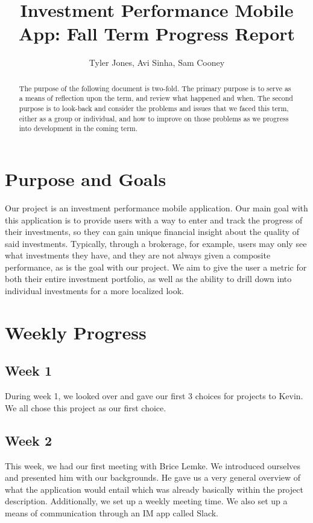 \documentclass[letterpaper,10pt,titlepage,journal,compsoc,draftclsnofoot,onecolumn]{IEEEtran}
\title{Investment Performance Mobile App: Fall Term Progress Report}
\author{Tyler Jones, Avi Sinha, Sam Cooney}
\newcommand\tab[1][1cm]{\hspace*{#1}}
\begin{document}
\begin{titlingpage}
    \maketitle
	\centering{}
    \begin{abstract}
        
     The purpose of the following document is two-fold. The primary purpose is to serve as a means of reflection upon the term, and review what happened and when. The second purpose is to look-back and consider the problems and issues that we faced this term, either as a group or individual, and how to improve on those problems as we progress into development in the coming term.
        
    \end{abstract}
\end{titlingpage}

\newpage

\tableofcontents{}

\newpage

\section{Purpose and Goals}

\tab Our project is an investment performance mobile application. Our main goal with this application is to provide users with a way to enter and track the progress of their investments, so they can gain unique financial insight about the quality of said investments. Typically, through a brokerage, for example, users may only see what investments they have, and they are not always given a composite performance, as is the goal with our project. We aim to give the user a metric for both their entire investment portfolio, as well as the ability to drill down into individual investments for a more localized look.

\section{Weekly Progress}

    \subsection{Week 1}
    During week 1, we looked over and gave our first 3 choices for projects to Kevin. We all chose this project as our first choice. 
    
    \subsection{Week 2}
    This week, we had our first meeting with Brice Lemke. We introduced ourselves and presented him with our backgrounds. He gave us a very general overview of what the application would entail which was already basically within the project description. Additionally, we set up a weekly meeting time. We also set up a means of communication through an IM app called Slack.
    
\end{document}
